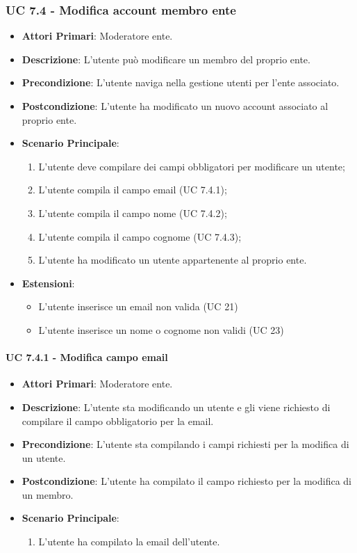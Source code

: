 			\subsubsection{UC 7.4 - Modifica account membro ente}
			\begin{itemize}
				\item \textbf{Attori Primari}: Moderatore ente.
				\item \textbf{Descrizione}: L'utente può modificare un membro del proprio ente.
				\item \textbf{Precondizione}: L'utente naviga nella gestione utenti per l'ente associato.
				\item \textbf{Postcondizione}: L'utente ha modificato un nuovo account associato al proprio ente.
				\item \textbf{Scenario Principale}:
				\begin{enumerate}
					\item{L'utente deve compilare dei campi obbligatori per modificare un utente;}
					\item{L'utente compila il campo email (UC 7.4.1);}
					\item{L'utente compila il campo nome (UC 7.4.2);}
					\item{L'utente compila il campo cognome (UC 7.4.3);}
					\item{L'utente ha modificato un utente appartenente al proprio ente.}
				\end{enumerate}	
				\item \textbf{Estensioni}:
				\begin{itemize}
					\item L'utente inserisce un email non valida (UC 21)
					\item L'utente inserisce un nome o cognome non validi (UC 23)
				\end{itemize}
			\end{itemize}
			
			\paragraph{UC 7.4.1 - Modifica campo email}
			\begin{itemize}
				\item \textbf{Attori Primari}: Moderatore ente.
				\item \textbf{Descrizione}: L'utente sta modificando un utente e gli viene richiesto di compilare il campo obbligatorio per la email.
				\item \textbf{Precondizione}: L'utente sta compilando i campi richiesti per la modifica di un utente.
				\item \textbf{Postcondizione}: L'utente ha compilato il campo richiesto per la modifica di un membro.
				\item \textbf{Scenario Principale}:
				\begin{enumerate}
					\item{L'utente ha compilato la email dell'utente.}
				\end{enumerate}	
			\end{itemize}

